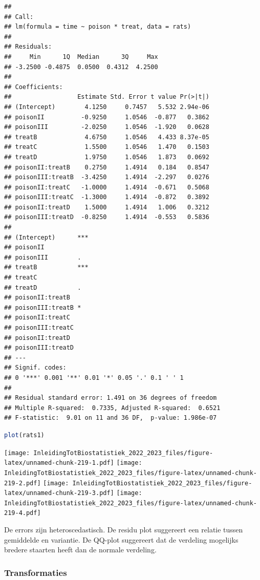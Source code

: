 \documentclass[
  12pt,dutch,coursenotes]{book}
\begin{document}
\begin{lstlisting}
## 
## Call:
## lm(formula = time ~ poison * treat, data = rats)
## 
## Residuals:
##     Min      1Q  Median      3Q     Max 
## -3.2500 -0.4875  0.0500  0.4312  4.2500 
## 
## Coefficients:
##                  Estimate Std. Error t value Pr(>|t|)
## (Intercept)        4.1250     0.7457   5.532 2.94e-06
## poisonII          -0.9250     1.0546  -0.877   0.3862
## poisonIII         -2.0250     1.0546  -1.920   0.0628
## treatB             4.6750     1.0546   4.433 8.37e-05
## treatC             1.5500     1.0546   1.470   0.1503
## treatD             1.9750     1.0546   1.873   0.0692
## poisonII:treatB    0.2750     1.4914   0.184   0.8547
## poisonIII:treatB  -3.4250     1.4914  -2.297   0.0276
## poisonII:treatC   -1.0000     1.4914  -0.671   0.5068
## poisonIII:treatC  -1.3000     1.4914  -0.872   0.3892
## poisonII:treatD    1.5000     1.4914   1.006   0.3212
## poisonIII:treatD  -0.8250     1.4914  -0.553   0.5836
##                     
## (Intercept)      ***
## poisonII            
## poisonIII        .  
## treatB           ***
## treatC              
## treatD           .  
## poisonII:treatB     
## poisonIII:treatB *  
## poisonII:treatC     
## poisonIII:treatC    
## poisonII:treatD     
## poisonIII:treatD    
## ---
## Signif. codes:  
## 0 '***' 0.001 '**' 0.01 '*' 0.05 '.' 0.1 ' ' 1
## 
## Residual standard error: 1.491 on 36 degrees of freedom
## Multiple R-squared:  0.7335, Adjusted R-squared:  0.6521 
## F-statistic:  9.01 on 11 and 36 DF,  p-value: 1.986e-07
\end{lstlisting}

\begin{lstlisting}[language=R]
plot(rats1)
\end{lstlisting}

\texttt{[image: InleidingTotBiostatistiek\_2022\_2023\_files/figure-latex/unnamed-chunk-219-1.pdf]} \texttt{[image: InleidingTotBiostatistiek\_2022\_2023\_files/figure-latex/unnamed-chunk-219-2.pdf]} \texttt{[image: InleidingTotBiostatistiek\_2022\_2023\_files/figure-latex/unnamed-chunk-219-3.pdf]} \texttt{[image: InleidingTotBiostatistiek\_2022\_2023\_files/figure-latex/unnamed-chunk-219-4.pdf]}

De errors zijn heteroscedastisch. De residu plot suggereert een relatie tussen gemiddelde en variantie. De QQ-plot suggereert dat de verdeling mogelijks bredere staarten heeft dan de normale verdeling.

\hypertarget{transformaties}{%
\subsubsection{Transformaties}\label{transformaties}}
\end{document}
